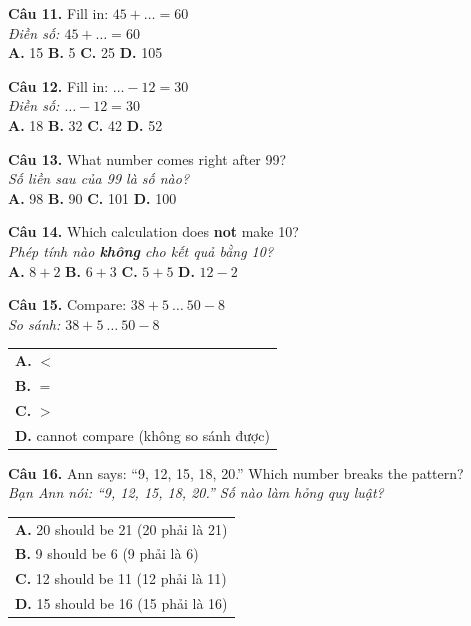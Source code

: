 \documentclass[11pt,a4paper]{article}
\begin{document}
\textbf{Câu 11.} Fill in: $45+\ldots=60$\\
\textit{Điền số: $45+\ldots=60$}\\
\textbf{A.} 15 \quad \textbf{B.} 5 \quad \textbf{C.} 25 \quad \textbf{D.} 105\par\vspace{1.2mm}

\textbf{Câu 12.} Fill in: $\ldots-12=30$\\
\textit{Điền số: $\ldots-12=30$}\\
\textbf{A.} 18 \quad \textbf{B.} 32 \quad \textbf{C.} 42 \quad \textbf{D.} 52\par\vspace{1.2mm}

\textbf{Câu 13.} What number comes right after 99?\\
\textit{Số liền sau của 99 là số nào?}\\
\textbf{A.} 98 \quad \textbf{B.} 90 \quad \textbf{C.} 101 \quad \textbf{D.} 100\par\vspace{1.2mm}

\textbf{Câu 14.} Which calculation does \textbf{not} make 10?\\
\textit{Phép tính nào \textbf{không} cho kết quả bằng 10?}\\
\textbf{A.} $8+2$ \quad \textbf{B.} $6+3$ \quad \textbf{C.} $5+5$ \quad \textbf{D.} $12-2$\par\vspace{1.2mm}

\textbf{Câu 15.} Compare: $38+5\ \ldots\ 50-8$\\
\textit{So sánh: $38+5\ \ldots\ 50-8$}\\
\begin{tabular}{@{}l@{}}
\textbf{A.} $<$\\
\textbf{B.} $=$\\
\textbf{C.} $>$\\
\textbf{D.} cannot compare (không so sánh được)
\end{tabular}\par\vspace{1.2mm}

\textbf{Câu 16.} Ann says: ``9, 12, 15, 18, 20.'' Which number breaks the pattern?\\
\textit{Bạn Ann nói: ``9, 12, 15, 18, 20.'' Số nào làm hỏng quy luật?}\\
\begin{tabular}{@{}l@{}}
\textbf{A.} 20 should be 21 (20 phải là 21)\\
\textbf{B.} 9 should be 6 (9 phải là 6)\\
\textbf{C.} 12 should be 11 (12 phải là 11)\\
\textbf{D.} 15 should be 16 (15 phải là 16)
\end{tabular}\par\vspace{1.2mm}
\end{document}
